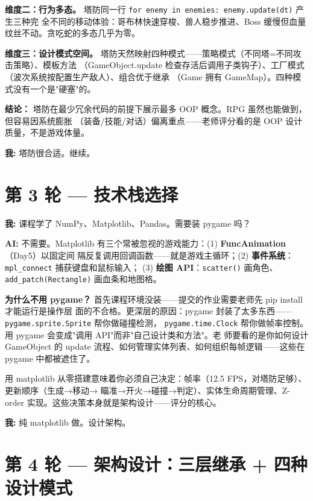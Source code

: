 \documentclass[12pt,a4paper]{ctexart}
\begin{document}
\textbf{维度二：行为多态。} 塔防同一行 \texttt{for enemy in enemies: enemy.update(dt)} 产生三种完
全不同的移动体验：哥布林快速穿梭、兽人稳步推进、Boss 缓慢但血量纹丝不动。贪吃蛇的多态几乎为零。

\textbf{维度三：设计模式空间。} 塔防天然映射四种模式——策略模式（不同塔=不同攻击策略）、模板方法
（GameObject.update 检查存活后调用子类钩子）、工厂模式（波次系统按配置生产敌人）、组合优于继承
（Game 拥有 GameMap）。四种模式没有一个是"硬塞"的。

\textbf{结论：} 塔防在最少冗余代码的前提下展示最多 OOP 概念。RPG 虽然也能做到，但容易因系统膨胀
（装备/技能/对话）偏离重点——老师评分看的是 OOP 设计质量，不是游戏体量。

\textbf{我:} 塔防很合适。继续。

\section*{第 3 轮 — 技术栈选择}

\textbf{我:} 课程学了 NumPy、Matplotlib、Pandas。需要装 pygame 吗？

\textbf{AI:} 不需要。Matplotlib 有三个常被忽视的游戏能力：(1) \textbf{FuncAnimation}（Day5）以固定间
隔反复调用回调函数——就是游戏主循环；(2) \textbf{事件系统}：\texttt{mpl\_connect} 捕获键盘和鼠标输入；
(3) \textbf{绘图 API}：\texttt{scatter()} 画角色、\texttt{add\_patch(Rectangle)} 画血条和地图格。

\textbf{为什么不用 pygame？} 首先课程环境没装——提交的作业需要老师先 pip install 才能运行是操作层
面的不合格。更深层的原因：pygame 封装了太多东西——\texttt{pygame.sprite.Sprite} 帮你做碰撞检测，
\texttt{pygame.time.Clock} 帮你做帧率控制。用 pygame 会变成"调用 API"而非"自己设计类和方法"。老
师要看的是你如何设计 GameObject 的 update 流程、如何管理实体列表、如何组织每帧逻辑——这些在
pygame 中都被遮住了。

用 matplotlib 从零搭建意味着你必须自己决定：帧率（12.5 FPS，对塔防足够）、更新顺序（生成→移动→
瞄准→开火→碰撞→判定）、实体生命周期管理、Z-order 实现。这些决策本身就是架构设计——评分的核心。

\textbf{我:} 纯 matplotlib 做。设计架构。

\section*{第 4 轮 — 架构设计：三层继承 + 四种设计模式}
\end{document}
